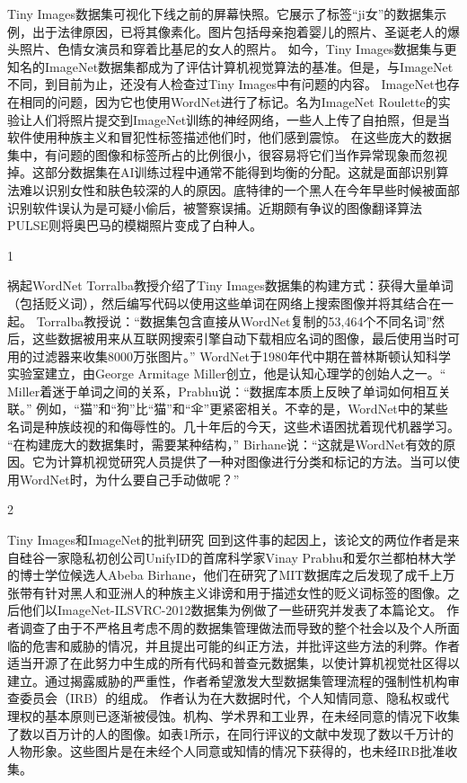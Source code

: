Tiny Images数据集可视化下线之前的屏幕快照。它展示了标签“ji女”的数据集示例，出于法律原因，已将其像素化。图片包括母亲抱着婴儿的照片、圣诞老人的爆头照片、色情女演员和穿着比基尼的女人的照片。
如今，Tiny Images数据集与更知名的ImageNet数据集都成为了评估计算机视觉算法的基准。但是，与ImageNet不同，到目前为止，还没有人检查过Tiny Images中有问题的内容。
ImageNet也存在相同的问题，因为它也使用WordNet进行了标记。名为ImageNet Roulette的实验让人们将照片提交到ImageNet训练的神经网络，一些人上传了自拍照，但是当软件使用种族主义和冒犯性标签描述他们时，他们感到震惊。
在这些庞大的数据集中，有问题的图像和标签所占的比例很小，很容易将它们当作异常现象而忽视掉。这部分数据集在AI训练过程中通常不能得到均衡的分配。这就是面部识别算法难以识别女性和肤色较深的人的原因。底特律的一个黑人在今年早些时候被面部识别软件误认为是可疑小偷后，被警察误捕。近期颇有争议的图像翻译算法PULSE则将奥巴马的模糊照片变成了白种人。
 
1


祸起WordNet 
Torralba教授介绍了Tiny Images数据集的构建方式：获得大量单词（包括贬义词），然后编写代码以使用这些单词在网络上搜索图像并将其结合在一起。
Torralba教授说：“数据集包含直接从WordNet复制的53,464个不同名词”然后，这些数据被用来从互联网搜索引擎自动下载相应名词的图像，最后使用当时可用的过滤器来收集8000万张图片。”
WordNet于1980年代中期在普林斯顿认知科学实验室建立，由George Armitage Miller创立，他是认知心理学的创始人之一。“ Miller着迷于单词之间的关系，Prabhu说：“数据库本质上反映了单词如何相互关联。”
例如，“猫”和“狗”比“猫”和“伞”更紧密相关。不幸的是，WordNet中的某些名词是种族歧视的和侮辱性的。几十年后的今天，这些术语困扰着现代机器学习。
“在构建庞大的数据集时，需要某种结构，” Birhane说：“这就是WordNet有效的原因。它为计算机视觉研究人员提供了一种对图像进行分类和标记的方法。当可以使用WordNet时，为什么要自己手动做呢？”
 
2


Tiny Images和ImageNet的批判研究
回到这件事的起因上，该论文的两位作者是来自硅谷一家隐私初创公司UnifyID的首席科学家Vinay Prabhu和爱尔兰都柏林大学的博士学位候选人Abeba Birhane，他们在研究了MIT数据库之后发现了成千上万张带有针对黑人和亚洲人的种族主义诽谤和用于描述女性的贬义词标签的图像。之后他们以ImageNet-ILSVRC-2012数据集为例做了一些研究并发表了本篇论文。
作者调查了由于不严格且考虑不周的数据集管理做法而导致的整个社会以及个人所面临的危害和威胁的情况，并且提出可能的纠正方法，并批评这些方法的利弊。作者适当开源了在此努力中生成的所有代码和普查元数据集，以使计算机视觉社区得以建立。通过揭露威胁的严重性，作者希望激发大型数据集管理流程的强制性机构审查委员会（IRB）的组成。
作者认为在大数据时代，个人知情同意、隐私权或代理权的基本原则已逐渐被侵蚀。机构、学术界和工业界，在未经同意的情况下收集了数以百万计的人的图像。如表1所示，在同行评议的文献中发现了数以千万计的人物形象。这些图片是在未经个人同意或知情的情况下获得的，也未经IRB批准收集。

